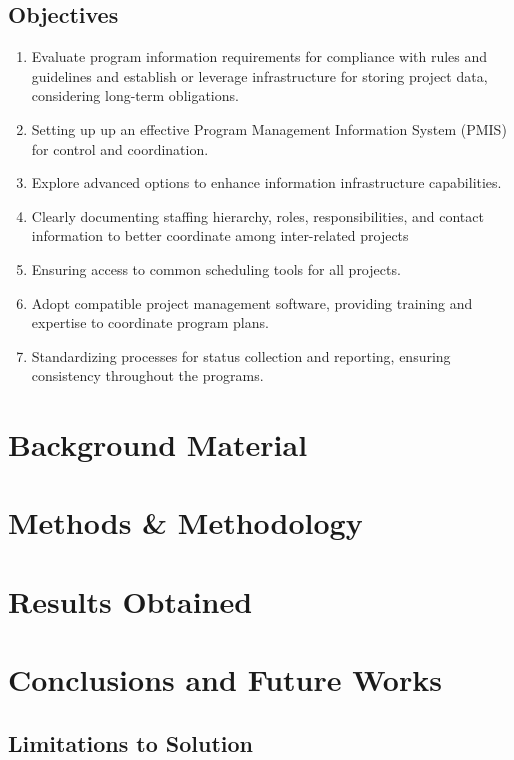 \documentclass[runningheads]{llncs}
\begin{document}
\subsection{Objectives}
\begin{enumerate}

\item Evaluate program information requirements for compliance with rules and guidelines and establish or leverage infrastructure for storing project data, considering long-term obligations.
\item Setting up up an effective Program Management Information System (PMIS) for control and coordination.
\item Explore advanced options to enhance information infrastructure capabilities.
\item Clearly documenting staffing hierarchy, roles, responsibilities, and contact information to better coordinate among inter-related projects
\item Ensuring access to common scheduling tools for all projects.
\item Adopt compatible project management software, providing training and expertise to coordinate program plans.
\item Standardizing processes for status collection and reporting, ensuring consistency throughout the programs.

\end{enumerate}

\section{Background Material}

\section{Methods \& Methodology}

\section{Results Obtained}

\section{Conclusions and Future Works}

\subsection{Limitations to Solution}
\end{document}
